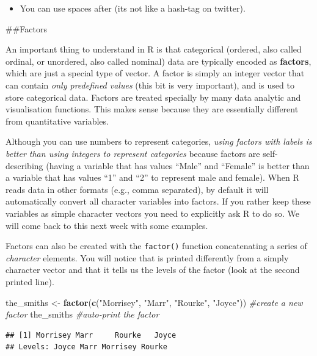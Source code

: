 \documentclass[]{book}
\newenvironment{Shaded}{\begin{snugshade}}{\end{snugshade}}
\newcommand{\CommentTok}[1]{\textcolor[rgb]{0.56,0.35,0.01}{\textit{#1}}}
\newcommand{\KeywordTok}[1]{\textcolor[rgb]{0.13,0.29,0.53}{\textbf{#1}}}
\newcommand{\NormalTok}[1]{#1}
\newcommand{\StringTok}[1]{\textcolor[rgb]{0.31,0.60,0.02}{#1}}
\providecommand{\tightlist}{%
  \setlength{\itemsep}{0pt}\setlength{\parskip}{0pt}}
\theoremstyle{definition}
\theoremstyle{definition}
\theoremstyle{definition}
\theoremstyle{remark}
\begin{document}
\begin{itemize}
\tightlist
\item
  You can use spaces after (its not like a hash-tag on twitter).
\end{itemize}

\#\#Factors

An important thing to understand in R is that categorical (ordered, also
called ordinal, or unordered, also called nominal) data are typically
encoded as \textbf{factors}, which are just a special type of vector. A
factor is simply an integer vector that can contain \emph{only
predefined values} (this bit is very important), and is used to store
categorical data. Factors are treated specially by many data analytic
and visualisation functions. This makes sense because they are
essentially different from quantitative variables.

Although you can use numbers to represent categories, \emph{using
factors with labels is better than using integers to represent
categories} because factors are self-describing (having a variable that
has values ``Male'' and ``Female'' is better than a variable that has
values ``1'' and ``2'' to represent male and female). When R reads data
in other formats (e.g., comma separated), by default it will
automatically convert all character variables into factors. If you
rather keep these variables as simple character vectors you need to
explicitly ask R to do so. We will come back to this next week with some
examples.

Factors can also be created with the \texttt{factor()} function
concatenating a series of \emph{character} elements. You will notice
that is printed differently from a simply character vector and that it
tells us the levels of the factor (look at the second printed line).

\begin{Shaded}
\begin{Highlighting}[]
\NormalTok{the_smiths <-}\StringTok{ }\KeywordTok{factor}\NormalTok{(}\KeywordTok{c}\NormalTok{(}\StringTok{"Morrisey"}\NormalTok{, }\StringTok{"Marr"}\NormalTok{, }\StringTok{"Rourke"}\NormalTok{, }\StringTok{"Joyce"}\NormalTok{)) }\CommentTok{#create a new factor}
\NormalTok{the_smiths }\CommentTok{#auto-print the factor}
\end{Highlighting}
\end{Shaded}

\begin{verbatim}
## [1] Morrisey Marr     Rourke   Joyce   
## Levels: Joyce Marr Morrisey Rourke
\end{verbatim}
\end{document}
